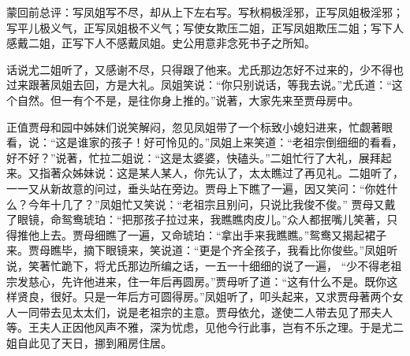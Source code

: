 

\begin{parag}
    \begin{note}蒙回前总评：写凤姐写不尽，却从上下左右写。写秋桐极淫邪，正写凤姐极淫邪；写平儿极义气，正写凤姐极不义气；写使女欺压二姐，正写凤姐欺压二姐；写下人感戴二姐，正写下人不感戴凤姐。史公用意非念死书子之所知。\end{note}
\end{parag}


\begin{parag}
    话说尤二姐听了，又感谢不尽，只得跟了他来。尤氏那边怎好不过来的，少不得也过来跟著凤姐去回，方是大礼。凤姐笑说：“你只别说话，等我去说。”尤氏道：“这个自然。但一有个不是，是往你身上推的。”说著，大家先来至贾母房中。
\end{parag}


\begin{parag}
    正值贾母和园中姊妹们说笑解闷，忽见凤姐带了一个标致小媳妇进来，忙觑著眼看，说：“这是谁家的孩子！好可怜见的。”凤姐上来笑道：“老祖宗倒细细的看看，好不好？”说著，忙拉二姐说：“这是太婆婆，快磕头。”二姐忙行了大礼，展拜起来。又指著众姊妹说：这是某人某人，你先认了，太太瞧过了再见礼。二姐听了，一一又从新故意的问过，垂头站在旁边。贾母上下瞧了一遍，因又笑问：“你姓什么？今年十几了？”凤姐忙又笑说：“老祖宗且别问，只说比我俊不俊。” 贾母又戴了眼镜，命鸳鸯琥珀：“把那孩子拉过来，我瞧瞧肉皮儿。”众人都抿嘴儿笑著，只得推他上去。贾母细瞧了一遍，又命琥珀：“拿出手来我瞧瞧。”鸳鸯又揭起裙子来。贾母瞧毕，摘下眼镜来，笑说道：“更是个齐全孩子，我看比你俊些。”凤姐听说，笑著忙跪下，将尤氏那边所编之话，一五一十细细的说了一遍， “少不得老祖宗发慈心，先许他进来，住一年后再圆房。”贾母听了道：“这有什么不是。既你这样贤良，很好。只是一年后方可圆得房。”凤姐听了，叩头起来，又求贾母著两个女人一同带去见太太们，说是老祖宗的主意。贾母依允，遂使二人带去见了邢夫人等。王夫人正因他风声不雅，深为忧虑，见他今行此事，岂有不乐之理。于是尤二姐自此见了天日，挪到厢房住居。
\end{parag}


